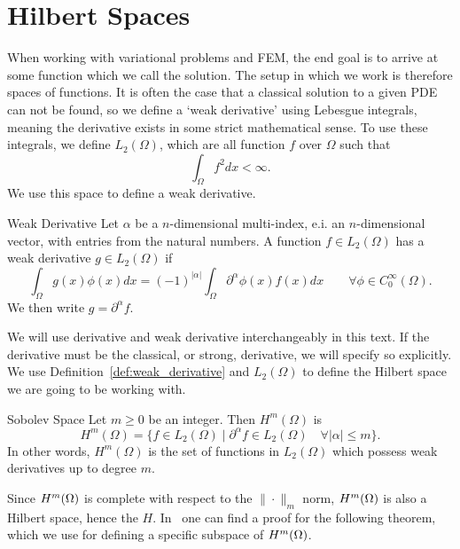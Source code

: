 \section{Hilbert Spaces}
When working with variational problems and FEM,
 the end goal is to arrive at some function which we call the solution.
The setup in which we work is therefore spaces of functions. 
It is often the case that a classical solution to a given PDE can 
not be found, 
so we define a `weak derivative' using Lebesgue integrals, meaning 
the derivative exists in some strict mathematical sense. 
To use these integrals, we define $L_2(\Omega)$, which are all 
function $f$ over $\Omega$ such that 
\begin{equation*}
   \int_\Omega f^2 dx < \infty. 
\end{equation*}
We use this space to define a weak derivative.
\begin{defn}{Weak Derivative}
   Let $\alpha$ be a $n$-dimensional multi-index, e.i. an $n$-dimensional vector, 
   with entries from the natural numbers.
    A function $f \in L_2(\Omega)$ has a weak derivative $g \in L_2(\Omega)$
    if
    \begin{equation*}
        \int_\Omega g(x)\phi(x) dx = {(-1)}^{|\alpha|}\int_\Omega 
        \partial ^{\alpha}\phi(x) f(x) dx
        \quad\quad \forall \phi \in C^\infty_0(\Omega).
    \end{equation*}
    We then write $g=\partial ^{\alpha}f$.\label{def:weak_derivative}
\end{defn}
We will use derivative and weak derivative interchangeably in this 
text.
If the derivative must be the classical, or strong, derivative, we will 
specify so explicitly. 
We use Definition~\ref*{def:weak_derivative} and $L_2(\Omega)$ to 
define the Hilbert space we are going to be working with. 
\begin{defn}{Sobolev Space}
   Let $m \geq 0$ be an integer. Then $H^m(\Omega)$ is 
   \begin{equation*}
    H^m(\Omega) = \{  f \in L_2(\Omega) \mid \partial ^{\alpha}f \in 
    L_2(\Omega) \quad \forall |\alpha| \leq m  \}.
   \end{equation*}
   In other words, $H^m(\Omega)$ is the set of functions in $L_2(\Omega)$ 
   which possess weak derivatives up to degree $m$.
\end{defn}
Since $H^m(\Omega)$ is complete with respect to the $\| \cdot\|_m$ norm, 
$H^m(\Omega)$ is also a Hilbert space, hence the $H$.
In~\cite{Brezis} one can find a proof for the following theorem, which 
we use for defining a specific subspace of $H^m(\Omega)$.
